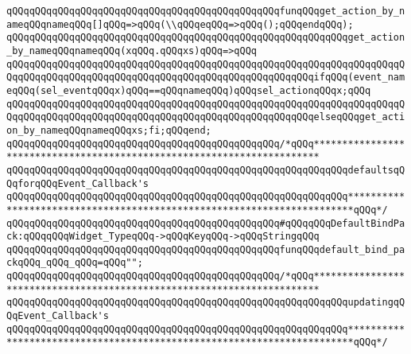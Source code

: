\newline
\newline
\verb|qQQqqQQqqQQqqQQqqQQqqQQqqQQqqQQqqQQqqQQqqQQqqQQqfunqQQqget_action_by_nameqQQqnameqQQq[]qQQq=>qQQq(\\qQQqeqQQq=>qQQq();qQQqendqQQq);|\newline
\verb|qQQqqQQqqQQqqQQqqQQqqQQqqQQqqQQqqQQqqQQqqQQqqQQqqQQqqQQqqQQqget_action_by_nameqQQqnameqQQq(xqQQq.qQQqxs)qQQq=>qQQq|\newline
\verb|qQQqqQQqqQQqqQQqqQQqqQQqqQQqqQQqqQQqqQQqqQQqqQQqqQQqqQQqqQQqqQQqqQQqqQQqqQQqqQQqqQQqqQQqqQQqqQQqqQQqqQQqqQQqqQQqqQQqqQQqqQQqifqQQq(event_nameqQQq(sel_eventqQQqx)qQQq==qQQqnameqQQq)qQQqsel_actionqQQqx;qQQq|\newline
\verb|qQQqqQQqqQQqqQQqqQQqqQQqqQQqqQQqqQQqqQQqqQQqqQQqqQQqqQQqqQQqqQQqqQQqqQQqqQQqqQQqqQQqqQQqqQQqqQQqqQQqqQQqqQQqqQQqqQQqqQQqqQQqelseqQQqget_action_by_nameqQQqnameqQQqxs;fi;qQQqend;|\newline
\newline
\verb|qQQqqQQqqQQqqQQqqQQqqQQqqQQqqQQqqQQqqQQqqQQqqQQq/*qQQq***********************************************************************|\newline
\newline
\verb|qQQqqQQqqQQqqQQqqQQqqQQqqQQqqQQqqQQqqQQqqQQqqQQqqQQqqQQqqQQqdefaultsqQQqforqQQqEvent_Callback's|\newline
\newline
\verb|qQQqqQQqqQQqqQQqqQQqqQQqqQQqqQQqqQQqqQQqqQQqqQQqqQQqqQQqqQQq***********************************************************************qQQq*/|\newline
\newline
\verb|qQQqqQQqqQQqqQQqqQQqqQQqqQQqqQQqqQQqqQQqqQQqqQQq#qQQqqQQqDefaultBindPack:qQQqqQQqWidget_TypeqQQq->qQQqKeyqQQq->qQQqStringqQQq|\newline
\verb|qQQqqQQqqQQqqQQqqQQqqQQqqQQqqQQqqQQqqQQqqQQqqQQqfunqQQqdefault_bind_packqQQq_qQQq_qQQq=qQQq"";|\newline
\newline
\verb|qQQqqQQqqQQqqQQqqQQqqQQqqQQqqQQqqQQqqQQqqQQqqQQq/*qQQq***********************************************************************|\newline
\newline
\verb|qQQqqQQqqQQqqQQqqQQqqQQqqQQqqQQqqQQqqQQqqQQqqQQqqQQqqQQqqQQqupdatingqQQqEvent_Callback's|\newline
\newline
\verb|qQQqqQQqqQQqqQQqqQQqqQQqqQQqqQQqqQQqqQQqqQQqqQQqqQQqqQQqqQQq***********************************************************************qQQq*/|\newline
